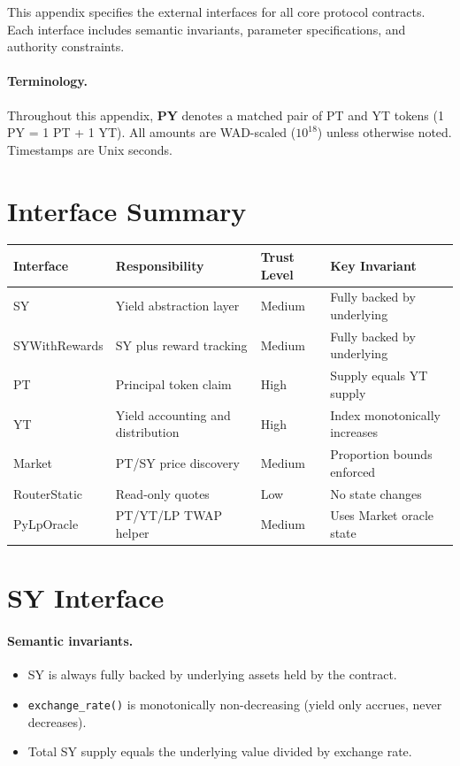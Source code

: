 
This appendix specifies the external interfaces for all core protocol contracts. Each interface includes semantic invariants, parameter specifications, and authority constraints.

\paragraph{Terminology.}
Throughout this appendix, \textbf{PY} denotes a matched pair of PT and YT tokens (1 PY = 1 PT + 1 YT). All amounts are WAD-scaled ($10^{18}$) unless otherwise noted. Timestamps are Unix seconds.


\section{Interface Summary}

\begin{center}
\begin{tabular}{l l l l}
\toprule
\textbf{Interface} & \textbf{Responsibility} & \textbf{Trust Level} & \textbf{Key Invariant} \\
\midrule
SY & Yield abstraction layer & Medium & Fully backed by underlying \\
SYWithRewards & SY plus reward tracking & Medium & Fully backed by underlying \\
PT & Principal token claim & High & Supply equals YT supply \\
YT & Yield accounting and distribution & High & Index monotonically increases \\
Market & PT/SY price discovery & Medium & Proportion bounds enforced \\
RouterStatic & Read-only quotes & Low & No state changes \\
PyLpOracle & PT/YT/LP TWAP helper & Medium & Uses Market oracle state \\
\bottomrule
\end{tabular}
\end{center}


\section{SY Interface}

\paragraph{Semantic invariants.}
\begin{itemize}
\item SY is always fully backed by underlying assets held by the contract.
\item \texttt{exchange\_rate()} is monotonically non-decreasing (yield only accrues, never decreases).
\item Total SY supply equals the underlying value divided by exchange rate.
\end{itemize}

